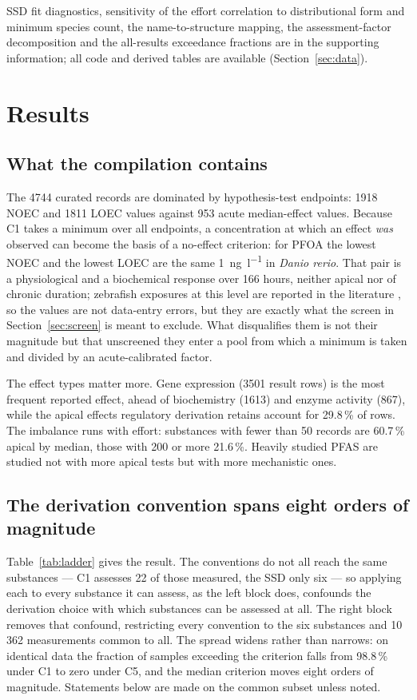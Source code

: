 \documentclass[preprint,12pt]{elsarticle}
\begin{document}
SSD fit diagnostics, sensitivity of the effort correlation to distributional
form and minimum species count, the name-to-structure mapping, the
assessment-factor decomposition and the all-results exceedance fractions are in
the supporting information; all code and derived tables are available
(Section~\ref{sec:data}).

\section{Results}

\subsection{What the compilation contains}

The 4744 curated records are dominated by hypothesis-test endpoints: 1918
\textsf{NOEC} and 1811 \textsf{LOEC} values against 953 acute median-effect
values. Because C1 takes a minimum over all endpoints, a
concentration at which an effect \emph{was} observed can become the basis of a
no-effect criterion: for PFOA the lowest \textsf{NOEC} and the lowest
\textsf{LOEC} are the same \SI{1}{\nano\gram\per\litre} in \emph{Danio
rerio}. That pair is a physiological and a biochemical response over 166 hours,
neither apical nor of chronic duration; zebrafish exposures at this level are
reported in the literature \cite{hagenaars2017pfoalow}, so the values are not
data-entry errors, but they are exactly what the screen in
Section~\ref{sec:screen} is meant to exclude. What disqualifies them is not
their magnitude but that unscreened they enter a pool from which a minimum is
taken and divided by an acute-calibrated factor.

The effect types matter more. Gene expression (3501 result rows) is the most frequent reported effect, ahead of biochemistry (1613) and
enzyme activity (867), while the apical effects regulatory derivation retains
account for 29.8\,\% of rows. The imbalance runs with effort: substances with
fewer than 50 records are 60.7\,\% apical by median, those with 200 or more
21.6\,\%. Heavily studied PFAS are studied not with more apical tests but with
more mechanistic ones.

\subsection{The derivation convention spans eight orders of magnitude}

Table~\ref{tab:ladder} gives the result. The conventions do not all reach the
same substances --- C1 assesses 22 of those measured, the SSD only six --- so
applying each to every substance it can assess, as the left block does,
confounds the derivation choice with which substances can be assessed at all.
The right block removes that confound, restricting every convention to the six
substances and 10\,362 measurements common to all. The spread widens rather
than narrows: on identical data the fraction of samples exceeding the
criterion falls from 98.8\,\% under C1 to zero under C5, and the median
criterion moves eight orders of magnitude. Statements below are made on the
common subset unless noted.
\end{document}
